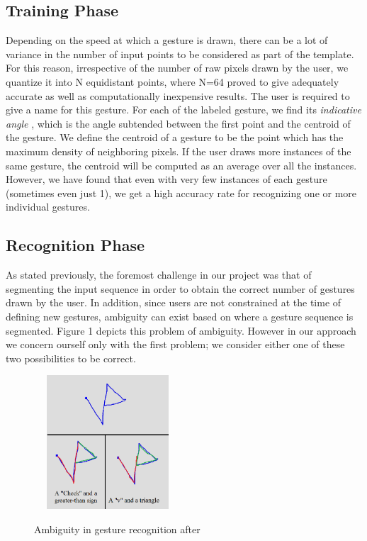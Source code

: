 \documentclass[twoside]{article}
\begin{document}
\begin{multicols}{2}
\subsection*{Training Phase}

Depending on the speed at which a gesture is drawn, there can be a lot of
variance in the number of input points to be considered as part of the template.
For this reason, irrespective of the number of raw pixels drawn by the user, we
quantize it into N equidistant points, where N=64 proved to give adequately
accurate as well as computationally inexpensive results. The user is required to
give a name for this gesture. For each of the labeled gesture, we find its
\textit{indicative angle} \cite{wobbrock2007gestures}, which is the angle
subtended between the first point and the centroid of the gesture. We define the
centroid of a gesture to be the point which has the maximum density of
neighboring pixels. If the user draws more instances of the same gesture, the
centroid will be computed as an average over all the instances. However, we have
found that even with very few instances of each gesture (sometimes even just 1),
we get a high accuracy rate for recognizing one or more individual gestures.

\subsection*{Recognition Phase}
As stated previously, the foremost challenge in our project was that of
segmenting the input sequence in order to obtain the correct number of gestures
drawn by the user. In addition, since users are not constrained at the time of
defining new gestures, ambiguity can exist based on where a gesture sequence is
segmented. Figure 1 depicts this problem of ambiguity. However in our approach
we concern ourself only with the first problem; we consider either one of these
two possibilities to be correct.

\begin{figure}[H]
	\centering
	\includegraphics[height=5cm, width=5.5cm]{Images/Ambiguity1.png}
	\label{fig1}
	\caption{Ambiguity in gesture recognition after}
\end{figure}


\end{multicols}
\end{document}
